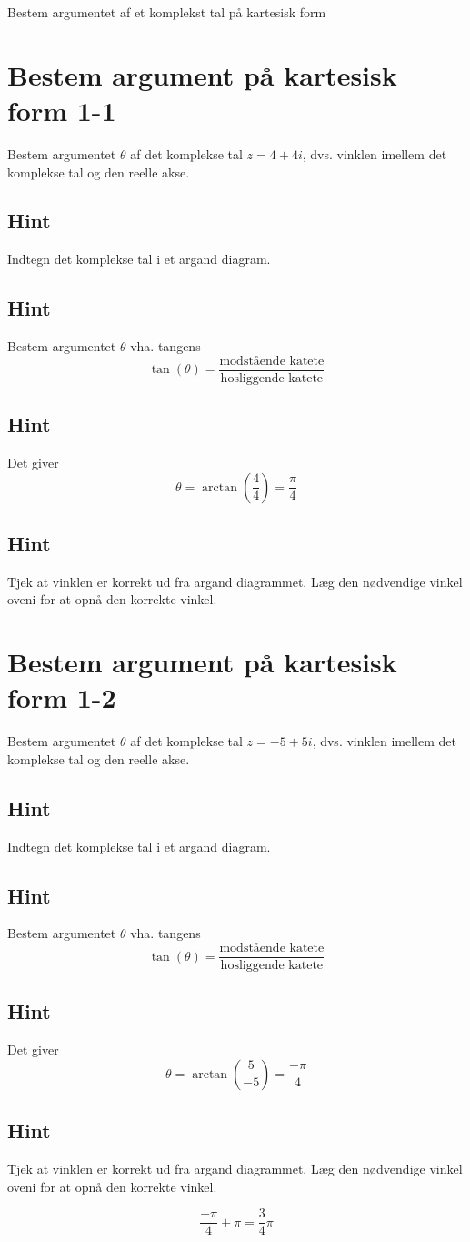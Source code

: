 \documentclass{article}
\newenvironment{exercise}[1]{\newpage\section{#1}}{}
\newcommand{\answerbox}[1]{\fbox{$#1$}}
\newcommand{\hint}{\subsection*{Hint}}
\begin{document}
Bestem argumentet af et komplekst tal på kartesisk form
\tableofcontents
\newpage

\begin{exercise}{Bestem argument på kartesisk form 1-1}

Bestem argumentet $\theta$ af det komplekse tal $z=4+4i$, dvs. vinklen imellem det komplekse tal og den reelle akse.

\answerbox{\frac{\pi}{4}}


\hint 

Indtegn det komplekse tal i et argand diagram.


\hint

Bestem argumentet $\theta$ vha. tangens
\[
\tan(\theta)=\frac{\textrm{modstående katete}}{\textrm{hosliggende katete}}
\]

\hint 

Det giver
\[
\theta = \arctan \left(\frac{4}{4}\right) = \frac{\pi}{4}
\]

\hint

Tjek at vinklen er korrekt ud fra argand diagrammet. Læg den nødvendige vinkel oveni for at opnå den korrekte vinkel. 


\end{exercise}

\newpage

\begin{exercise}{Bestem argument på kartesisk form 1-2}
	
	Bestem argumentet $\theta$ af det komplekse tal $z=-5+5i$, dvs. vinklen imellem det komplekse tal og den reelle akse.
	
	\answerbox{\frac{3}{4} \pi}
	
	
	\hint 
	
	Indtegn det komplekse tal i et argand diagram.
	
	
	\hint
	
	Bestem argumentet $\theta$ vha. tangens
	\[
	\tan(\theta)=\frac{\textrm{modstående katete}}{\textrm{hosliggende katete}}
	\]
	
	\hint 
	
	Det giver
	\[
	\theta = \arctan \left(\frac{5}{-5}\right) = \frac{-\pi}{4}
	\]
	
	\hint
	
	Tjek at vinklen er korrekt ud fra argand diagrammet. Læg den nødvendige vinkel oveni for at opnå den korrekte vinkel. 
	
	\[
	\frac{-\pi}{4} + \pi = \frac{3}{4} \pi
	\]
	
\end{exercise}
\end{document}
